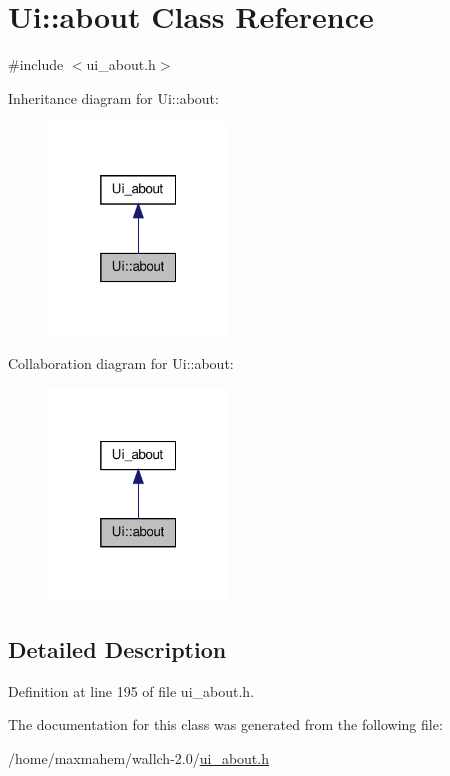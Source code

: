 \hypertarget{classUi_1_1about}{
\section{Ui::about Class Reference}
\label{classUi_1_1about}
}


{\ttfamily \#include $<$ui\_\-about.h$>$}



Inheritance diagram for Ui::about:
\nopagebreak
\begin{figure}[H]
\begin{center}
\leavevmode
\includegraphics[width=136pt]{classUi_1_1about__inherit__graph}
\end{center}
\end{figure}


Collaboration diagram for Ui::about:
\nopagebreak
\begin{figure}[H]
\begin{center}
\leavevmode
\includegraphics[width=136pt]{classUi_1_1about__coll__graph}
\end{center}
\end{figure}


\subsection{Detailed Description}


Definition at line 195 of file ui\_\-about.h.



The documentation for this class was generated from the following file:\begin{DoxyCompactItemize}
\item 
/home/maxmahem/wallch-\/2.0/\hyperlink{ui__about_8h}{ui\_\-about.h}\end{DoxyCompactItemize}
